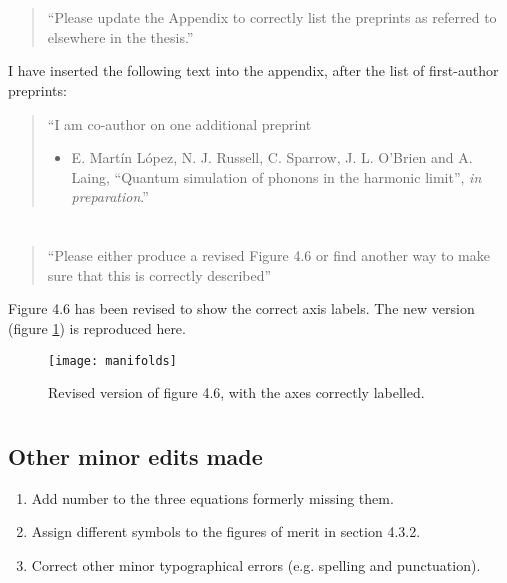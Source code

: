 \documentclass[a4paper,11pt]{article}
\begin{document}
\section{}
\begin{quote}
  ``Please update the Appendix to correctly list the preprints as
  referred to elsewhere in the thesis.''
\end{quote}
I have inserted the following text into the appendix, after the list of
first-author preprints:
\begin{quote}
  ``I am co-author on one additional preprint
  \begin{itemize}
    \item E. Mart\'in L\'opez, N. J. Russell, C. Sparrow, J. L. O'Brien and A.
      Laing, ``Quantum simulation of phonons in the harmonic limit'',
      \textit{in preparation}.''
  \end{itemize}
\end{quote}

\section{}
\begin{quote}
  ``Please either produce a revised Figure 4.6 or find another way to
  make sure that this is correctly described''
\end{quote}
Figure 4.6 has been revised to show the correct axis labels. The new version
(figure \ref{fig:manifolds}) is reproduced here.
\begin{figure}
  \centering
  \texttt{[image: manifolds]}
  \caption{Revised version of figure 4.6, with the axes correctly labelled.}
  \label{fig:manifolds}
\end{figure}

\section{}
\subsection*{Other minor edits made}
\begin{enumerate}
  \item Add number to the three equations formerly missing them.
  \item Assign different symbols to the figures of merit in section 4.3.2.
  \item Correct other minor typographical errors (e.g. spelling and
        punctuation).
\end{enumerate}
\end{document}
